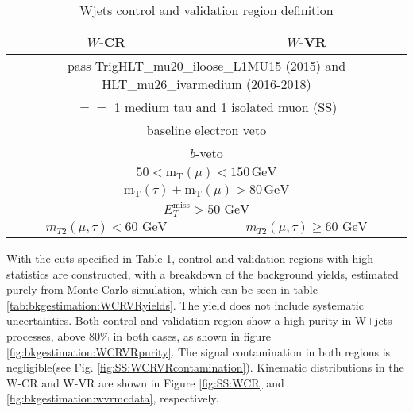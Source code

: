\begin{table}[!htpb]
\centering
\begin{tabular}{|c|c|} \hline
$W$-CR                 & $W$-VR \\ \hline
\multicolumn{2}{|c|}{pass TrigHLT\_mu20\_iloose\_L1MU15 (2015) and HLT\_mu26\_ivarmedium (2016-2018)} \\
\multicolumn{2}{|c|}{$==$ 1 medium tau and 1 isolated muon (SS) } \\
\multicolumn{2}{|c|}{baseline electron veto}\\
\multicolumn{2}{|c|}{$b$-veto}\\
\multicolumn{2}{|c|}{$50 < \text{m}_{\text{T}}(\mu)<150\,\text{GeV}$}\\
\multicolumn{2}{|c|}{$\text{m}_{\text{T}}(\tau)+\text{m}_{\text{T}}(\mu)>80\,\text{GeV}$}\\
\multicolumn{2}{|c|}{$E_T^\text{miss} > 50 \text{ GeV}$}\\
$m_{T2}(\mu,\tau) <  60 \text{ GeV}$ & $m_{T2}(\mu, \tau) \geq 60 \text{ GeV}$\\ \hline
\end{tabular}\caption{Wjets control and validation region definition \label{tab:bkgestimation:WCRVR}}
\end{table}

With the cuts specified in Table \ref{tab:bkgestimation:WCRVR},  control and validation regions with high statistics are constructed, with a breakdown of the background yields, estimated purely from Monte Carlo simulation, which can be seen in table \ref{tab:bkgestimation:WCRVRyields}.
The yield does not include systematic uncertainties.  Both control and validation region show a high purity in W+jets processes,  above 80$\%$ in both cases,  as shown in figure \ref{fig:bkgestimation:WCRVRpurity}.  The signal contamination in both regions is negligible(see Fig.  \ref{fig:SS:WCRVRcontamination}). Kinematic distributions in the W-CR and W-VR are shown in Figure \ref{fig:SS:WCR} and \ref{fig:bkgestimation:wvrmcdata}, respectively. 

